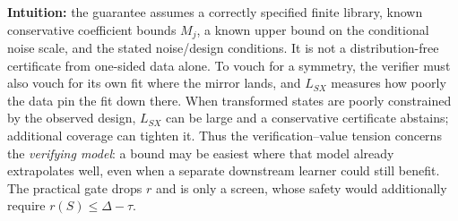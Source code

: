 \textbf{Intuition:} the guarantee assumes a correctly specified finite library, known conservative coefficient bounds $M_j$, a known upper bound on the conditional noise scale, and the stated noise/design conditions. It is not a distribution-free certificate from one-sided data alone. To vouch for a symmetry, the verifier must also vouch for its own fit where the mirror lands, and $L_{SX}$ measures how poorly the data pin the fit down there. When transformed states are poorly constrained by the observed design, $L_{SX}$ can be large and a conservative certificate abstains; additional coverage can tighten it. Thus the verification--value tension concerns the \emph{verifying model}: a bound may be easiest where that model already extrapolates well, even when a separate downstream learner could still benefit. The practical gate drops $r$ and is only a screen, whose safety would additionally require $r(S)\le\Delta-\tau$.

